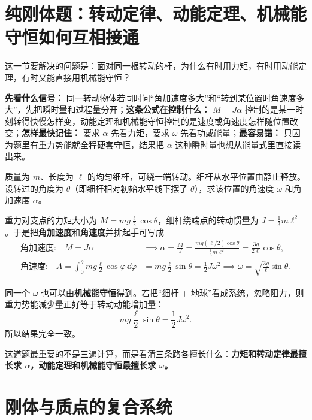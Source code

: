 \documentclass[lang=cn,11pt]{elegantbook}
\begin{document}
\section{纯刚体题：转动定律、动能定理、机械能守恒如何互相接通}

这一节要解决的问题是：面对同一根转动的杆，为什么有时用力矩，有时用动能定理，有时又能直接用机械能守恒？

\begin{note}
\textbf{先看什么信号：} 同一转动物体若同时问“角加速度多大”和“转到某位置时角速度多大”，先把瞬时量和过程量分开；\textbf{这条公式在控制什么：} \(M=J\alpha\) 控制的是某一时刻转得快慢怎样变，动能定理和机械能守恒控制的是速度或角速度怎样随位置改变；\textbf{怎样最快记住：} 要求 \(\alpha\) 先看力矩，要求 \(\omega\) 先看功或能量；\textbf{最容易错：} 只因为题里有重力势能就全程硬套守恒，结果把 \(\alpha\) 这种瞬时量也想从能量式里直接读出来。
\end{note}

\begin{example}[均匀细杆绕端点由水平下摆]
质量为 \(m\)、长度为 \(\ell\) 的均匀细杆，可绕一端转动。细杆从水平位置由静止释放。设转过的角度为 \(\theta\)（即细杆相对初始水平线下摆了 \(\theta\)），求该位置的角速度 \(\omega\) 和角加速度 \(\alpha\)。
\end{example}

\begin{solution}
重力对支点的力矩大小为 \(M=mg\frac{\ell}{2}\cos\theta\)，细杆绕端点的转动惯量为 \(J=\frac13 m\ell^2\)。于是把\textbf{角加速度}和\textbf{角速度}并排起手可写成
\[
\begin{aligned}
\text{角加速度:}\quad
M=J\alpha
&\implies
\alpha=\frac{M}{J}
=\frac{mg(\ell/2)\cos\theta}{\frac13 m\ell^2}
=\frac{3g}{2\ell}\cos\theta,\\
\text{角速度:}\quad
A=\int_0^\theta mg\frac{\ell}{2}\cos\varphi\,\dd\varphi
&=mg\frac{\ell}{2}\sin\theta
=\frac12 J\omega^2
\implies \omega=\sqrt{\frac{3g}{\ell}\sin\theta}.
\end{aligned}
\]

同一个 \(\omega\) 也可以由\textbf{机械能守恒}得到。若把“细杆 + 地球”看成系统，忽略阻力，则重力势能减少量正好等于转动动能增加量：
\[
mg\frac{\ell}{2}\sin\theta=\frac12 J\omega^2.
\]
所以结果完全一致。

这道题最重要的不是三遍计算，而是看清三条路各擅长什么：\textbf{力矩和转动定律最擅长求 \(\alpha\)，动能定理和机械能守恒最擅长求 \(\omega\)。}
\end{solution}

\section{刚体与质点的复合系统}
\end{document}
